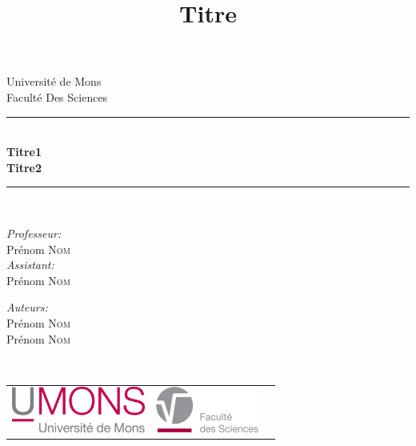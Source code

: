 \documentclass{article}
\title{Titre}
\author{ }
\date{ }
\begin{document}
\begin{titlepage}
    \begin{center}
        
        {\Large Université de Mons}\\[1ex]
        {\Large Faculté Des Sciences}\\[1ex]
        
        \newcommand{\HRule}{\rule{\linewidth}{0.3mm}}
        \HRule \\[0.3cm]
        { \LARGE \bfseries Titre1 \\[0.3cm]}
        { \LARGE \bfseries Titre2 \\[0.1cm]} %
        \HRule \\[1.5cm]
        
        \begin{minipage}[t]{0.45\textwidth}
            \begin{flushleft} \large
                \emph{Professeur:}\\
                Prénom \textsc{Nom}\\
                \emph{Assistant:}\\
                Prénom \textsc{Nom}\\
            \end{flushleft}
        \end{minipage}
        \begin{minipage}[t]{0.45\textwidth}
            \begin{flushright} \large
                \emph{Auteurs:} \\
                Prénom \textsc{Nom} \\
                Prénom \textsc{Nom} \\
            \end{flushright}
        \end{minipage}\\[2ex]
        
        \vfill
        
        \begin{center}
            \begin{tabular}[t]{c c c}
                \includegraphics[height=1.5cm]{images/logoumons.jpg} &
                \includegraphics[height=1.5cm]{images/logofs.jpg} &
                \hspace{0.3cm} &
            \end{tabular}
        \end{center}~\\
        

\end{center}
\end{titlepage}
\end{document}
